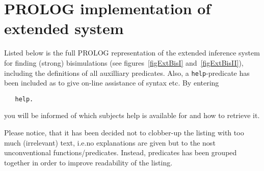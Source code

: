 \chapter[PROLOG implementation of extended system]{PROLOG implementation of extended system}\label{appExtProlog}

Listed below is the full PROLOG representation of the extended inference system for finding (strong) bisimulations (see figures~\ref{figExtBisI} and~\ref{figExtBisII}), including the definitions of all auxilliary predicates. Also, a \verb!help!-predicate has been included as to give on-line assistance of syntax etc. By entering
\begin{verbatim}
   help.
\end{verbatim}
you will be informed of which subjects help is available for and how to retrieve it.

Please notice, that it has been decided not to clobber-up the listing with too much (irrelevant) text, i.e.\@ no explanations are given but to the nost unconventional functions/predicates. Instead, predicates has been grouped together in order to improve readability of the listing.

\newpage

%

